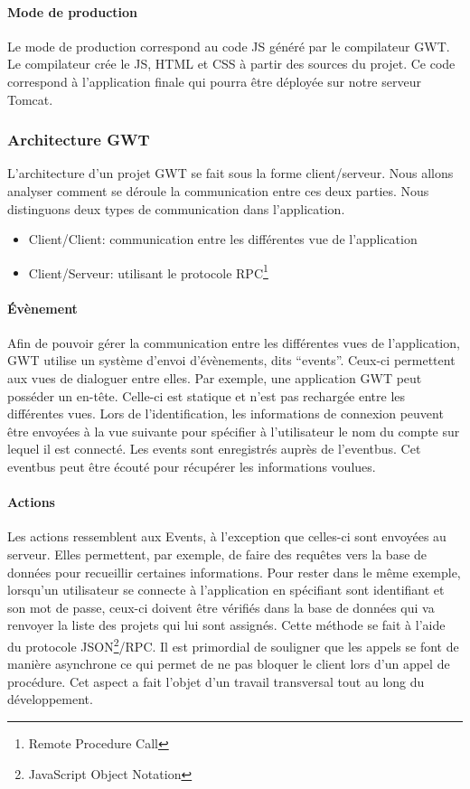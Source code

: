 \paragraph{Mode de production}
Le mode de production correspond au code JS généré par le compilateur GWT. Le compilateur crée le JS, HTML et CSS à partir des sources du projet. Ce code correspond à l'application finale qui pourra être déployée sur notre serveur Tomcat.

\subsubsection{Architecture GWT}
L'architecture d'un projet GWT se fait sous la forme client/serveur. Nous allons analyser comment se déroule la communication entre ces deux parties. Nous distinguons deux types de communication dans l'application.
\begin{itemize}
\item Client/Client: communication entre les différentes vue de l'application
\item Client/Serveur: utilisant le protocole RPC\footnote{Remote Procedure Call} 
\end{itemize}

\paragraph{Évènement}
Afin de pouvoir gérer la communication entre les différentes vues de l'application, GWT utilise un système d'envoi d'évènements, dits \enquote{events}. Ceux-ci permettent aux vues de dialoguer entre elles.
Par exemple, une application GWT peut posséder un en-tête. Celle-ci est statique et n'est pas rechargée entre les différentes vues. Lors de l'identification, les informations de connexion peuvent être envoyées à la vue suivante pour spécifier à l'utilisateur le nom du compte sur lequel il est connecté.
Les events sont enregistrés auprès de l'eventbus. Cet eventbus peut être écouté pour récupérer les informations voulues.

\paragraph{Actions}
Les actions ressemblent aux Events, à l'exception que celles-ci sont envoyées au serveur. Elles permettent, par exemple, de faire des requêtes vers la base de données pour recueillir certaines informations. Pour rester dans le même exemple, lorsqu'un utilisateur se connecte à l'application en spécifiant sont identifiant et son mot de passe, ceux-ci doivent être vérifiés dans la base de données qui va renvoyer la liste des projets qui lui sont assignés. Cette méthode se fait à l'aide du protocole JSON\footnote{JavaScript Object Notation}/RPC.
\newline
\indent
Il est primordial de souligner que les appels se font de manière asynchrone ce qui permet de ne pas bloquer le client lors d'un appel de procédure. Cet aspect a fait l'objet d'un travail transversal tout au long du développement. 
	
